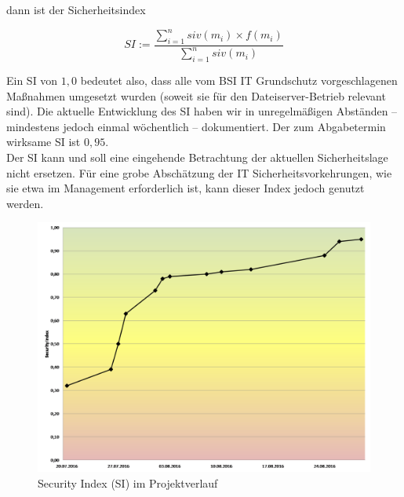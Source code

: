 dann ist der Sicherheitsindex

\begin{center}
\begin{equation}
SI:=\frac{\sum_{i=1}^n siv(m_i)\times f(m_i)}{\sum_{i=1}^{n}siv(m_i)}
\end{equation}
\end{center}

Ein SI von $1,0$ bedeutet also, dass alle vom BSI IT Grundschutz vorgeschlagenen Maßnahmen umgesetzt wurden (soweit sie für den Dateiserver-Betrieb relevant sind). Die aktuelle Entwicklung des SI haben wir in unregelmäßigen Abständen -- mindestens jedoch einmal wöchentlich -- dokumentiert. Der zum Abgabetermin wirksame SI ist $0,95$.\\

Der SI kann und soll eine eingehende Betrachtung der aktuellen Sicherheitslage nicht ersetzen. Für eine grobe Abschätzung der IT Sicherheitsvorkehrungen, wie sie etwa im Management erforderlich ist, kann dieser Index jedoch genutzt werden.

\begin{figure}[hbt!]
		\includegraphics[scale=0.66]{images/si.png}
	\caption{Security Index (SI) im Projektverlauf}
	\label{img:si}
\end{figure}


